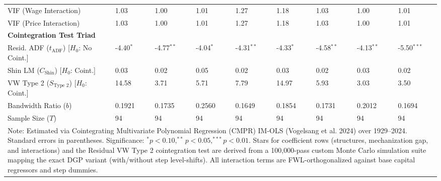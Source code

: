 \begin{table}[H]
\begin{tabular}{p{3.8cm}p{1.1cm}p{1.1cm}p{1.1cm}p{1.1cm}p{1.1cm}p{1.1cm}p{1.1cm}p{1.1cm}}
VIF (Wage Interaction) & 1.03 & 1.00 & 1.01 & 1.27 & 1.18 & 1.03 & 1.00 & 1.01 \\
VIF (Price Interaction) & 1.03 & 1.00 & 1.01 & 1.27 & 1.18 & 1.03 & 1.00 & 1.01 \\
\midrule
\multicolumn{9}{l}{\textbf{Cointegration Test Triad}} \\
Resid. ADF ($t_{\text{ADF}}$) [$H_0$: No Coint.] & -4.40$^{*}$ & -4.77$^{**}$ & -4.04$^{*}$ & -4.31$^{**}$ & -4.33$^{*}$ & -4.58$^{**}$ & -4.13$^{**}$ & -5.50$^{***}$ \\
Shin LM ($C_{\text{Shin}}$) [$H_0$: Coint.] & 0.03 & 0.02 & 0.05 & 0.02 & 0.03 & 0.02 & 0.03 & 0.02 \\
VW Type 2 ($S_{\text{Type 2}}$) [$H_0$: Coint.] & 14.58 & 3.71 & 5.71 & 7.79 & 14.97 & 5.93 & 3.03 & 3.50 \\
\midrule
Bandwidth Ratio ($b$) & 0.1921 & 0.1735 & 0.2560 & 0.1649 & 0.1854 & 0.1731 & 0.2012 & 0.1694 \\
Sample Size ($T$) & 94 & 94 & 94 & 94 & 94 & 94 & 94 & 94 \\
\bottomrule
\multicolumn{9}{p{12.6cm}}{\footnotesize Note: Estimated via Cointegrating Multivariate Polynomial Regression (CMPR) IM-OLS (Vogelsang et al. 2024) over 1929--2024. Standard errors in parentheses. Significance: $^* p < 0.10, ^{**} p < 0.05, ^{***} p < 0.01$. Stars for coefficient rows (structures, mechanization gap, and interactions) and the Residual VW Type 2 cointegration test are derived from a 100,000-pass custom Monte Carlo simulation suite mapping the exact DGP variant (with/without step level-shifts). All interaction terms are FWL-orthogonalized against base capital regressors and step dummies.}
\end{tabular}
\end{table}
